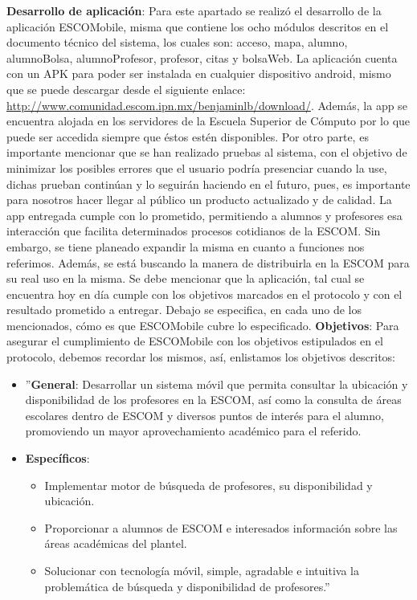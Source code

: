 \textbf{Desarrollo de aplicación}: Para este apartado se realizó el desarrollo de la aplicación ESCOMobile, misma que contiene los ocho módulos descritos en el documento técnico del sistema, los cuales son: acceso, mapa, alumno, alumnoBolsa, alumnoProfesor, profesor, citas y bolsaWeb. La aplicación cuenta con un APK para poder ser instalada en cualquier dispositivo android, mismo que se puede descargar desde el siguiente enlace: \url{ http://www.comunidad.escom.ipn.mx/benjaminlb/download/}. Además, la app se encuentra alojada en los servidores de la Escuela Superior de Cómputo por lo que puede ser accedida siempre que éstos estén disponibles. Por otro parte, es importante mencionar que se han realizado pruebas al sistema, con el objetivo de minimizar los posibles errores que el usuario podría presenciar cuando la use, dichas prueban continúan y lo seguirán haciendo en el futuro, pues, es importante para nosotros hacer llegar al público un producto actualizado y de calidad. La app entregada cumple con lo prometido, permitiendo a alumnos y profesores esa interacción que facilita determinados procesos cotidianos de la ESCOM. Sin embargo, se tiene planeado expandir la misma en cuanto a funciones nos referimos. Además, se está buscando la manera de distribuirla en la ESCOM para su real uso en la misma.
\newline
\newline
Se debe mencionar que la aplicación, tal cual se encuentra hoy en día cumple con los objetivos marcados en el protocolo y con el resultado prometido a entregar. Debajo se especifica, en cada uno de los mencionados, cómo es que ESCOMobile cubre lo especificado.
\newline
\newline
\textbf{Objetivos}: Para asegurar el cumplimiento de ESCOMobile con los objetivos estipulados en el protocolo, debemos recordar los mismos, así, enlistamos los objetivos descritos: 
\begin{itemize}
	\item ''\textbf{General}: Desarrollar un sistema móvil que permita consultar la ubicación y disponibilidad de los profesores en la ESCOM, así como la consulta de áreas escolares dentro de ESCOM y diversos puntos de interés para el alumno, promoviendo un mayor aprovechamiento académico para el referido. 
	\item \textbf{Específicos}:
	\begin{itemize}
		\item Implementar motor de búsqueda de profesores, su disponibilidad y ubicación. 
		\item Proporcionar a alumnos de ESCOM e interesados información sobre las áreas académicas del plantel.
		\item Solucionar con tecnología móvil, simple, agradable e intuitiva la problemática de búsqueda y disponibilidad de profesores.''  
	\end{itemize}
\end{itemize}
